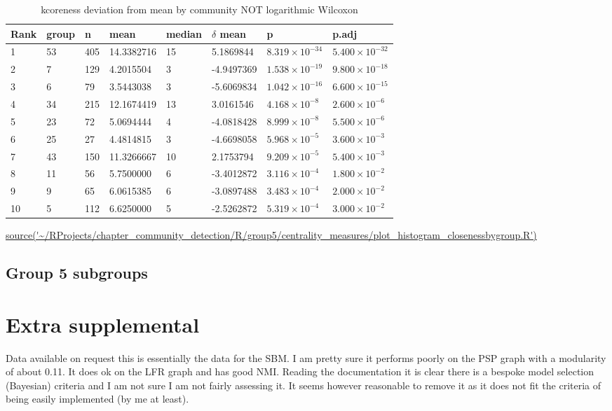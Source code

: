     
\begin{table}[ht]
\centering
\setlength{\extrarowheight}{2pt}
\begin{tabular}{llllllll}
  \toprule
Rank & group & n & mean & median &  $\delta$ mean & p & p.adj \\ 
  \midrule
1 & 53 & 405 & 14.3382716 & 15   & 5.1869844 & $8.319 \times 10^{-34}$ & $5.400 \times 10^{-32}$ \\ 
  2 & 7 & 129 & 4.2015504 & 3   & -4.9497369 & $1.538 \times 10^{-19}$ & $9.800 \times 10^{-18}$ \\ 
  3 & 6 & 79 & 3.5443038 & 3   & -5.6069834 & $1.042 \times 10^{-16}$ & $6.600 \times 10^{-15}$ \\ 
  4 & 34 & 215 & 12.1674419 & 13   & 3.0161546 & $4.168 \times 10^{-8}$ & $2.600 \times 10^{-6}$ \\ 
  5 & 23 & 72 & 5.0694444 & 4   & -4.0818428 & $8.999 \times 10^{-8}$ & $5.500 \times 10^{-6}$ \\ 
  6 & 25 & 27 & 4.4814815 & 3   & -4.6698058 & $5.968 \times 10^{-5}$ & $3.600 \times 10^{-3}$ \\ 
  7 & 43 & 150 & 11.3266667 & 10   & 2.1753794 & $9.209 \times 10^{-5}$ & $5.400 \times 10^{-3}$ \\ 
  8 & 11 & 56 & 5.7500000 & 6   & -3.4012872 & $3.116 \times 10^{-4}$ & $1.800 \times 10^{-2}$ \\ 
  9 & 9 & 65 & 6.0615385 & 6   & -3.0897488 & $3.483 \times 10^{-4}$ & $2.000 \times 10^{-2}$ \\ 
  10 & 5 & 112 & 6.6250000 & 5   & -2.5262872 & $5.319 \times 10^{-4}$ & $3.000 \times 10^{-2}$ \\ 
   \bottomrule
\end{tabular}
\caption{kcoreness deviation from mean by community NOT logarithmic Wilcoxon} 
\tiny\url{source('~/RProjects/chapter_community_detection/R/group5/centrality_measures/plot_histogram_closenessbygroup.R')}
\label{tab:kcoreness NOT logarithmic Wilcoxon}
\end{table}
 


\subsection{Group 5 subgroups}


\section{Extra supplemental}
Data available on request this is essentially the data for the SBM. I am pretty sure it performs poorly on the PSP graph with a modularity of about 0.11. It does ok on the LFR graph and has good NMI. Reading the documentation it is clear there is a bespoke model selection (Bayesian) criteria and I am not sure I am not fairly assessing it. It seems however reasonable to remove it as it does not fit the criteria of being easily implemented (by me at least).


